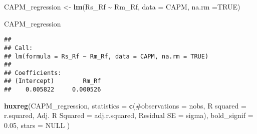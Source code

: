 \documentclass[
]{article}
\newenvironment{Shaded}{\begin{snugshade}}{\end{snugshade}}
\newcommand{\DataTypeTok}[1]{\textcolor[rgb]{0.13,0.29,0.53}{#1}}
\newcommand{\FloatTok}[1]{\textcolor[rgb]{0.00,0.00,0.81}{#1}}
\newcommand{\KeywordTok}[1]{\textcolor[rgb]{0.13,0.29,0.53}{\textbf{#1}}}
\newcommand{\NormalTok}[1]{#1}
\newcommand{\OperatorTok}[1]{\textcolor[rgb]{0.81,0.36,0.00}{\textbf{#1}}}
\newcommand{\OtherTok}[1]{\textcolor[rgb]{0.56,0.35,0.01}{#1}}
\newcommand{\StringTok}[1]{\textcolor[rgb]{0.31,0.60,0.02}{#1}}
\begin{document}
\begin{Shaded}
\begin{Highlighting}[]
\NormalTok{CAPM\_regression \textless{}{-}}\StringTok{ }\KeywordTok{lm}\NormalTok{(Rs\_Rf }\OperatorTok{\textasciitilde{}}\StringTok{ }\NormalTok{Rm\_Rf, }\DataTypeTok{data =}\NormalTok{ CAPM, }\DataTypeTok{na.rm =}\OtherTok{TRUE}\NormalTok{)}

\NormalTok{CAPM\_regression}
\end{Highlighting}
\end{Shaded}

\begin{verbatim}
## 
## Call:
## lm(formula = Rs_Rf ~ Rm_Rf, data = CAPM, na.rm = TRUE)
## 
## Coefficients:
## (Intercept)        Rm_Rf  
##    0.005822     0.000526
\end{verbatim}

\begin{Shaded}
\begin{Highlighting}[]
\KeywordTok{huxreg}\NormalTok{(CAPM\_regression,}
       \DataTypeTok{statistics =} \KeywordTok{c}\NormalTok{(}\StringTok{\textquotesingle{}\#observations\textquotesingle{}}\NormalTok{ =}\StringTok{ \textquotesingle{}nobs\textquotesingle{}}\NormalTok{, }
                      \StringTok{\textquotesingle{}R squared\textquotesingle{}}\NormalTok{ =}\StringTok{ \textquotesingle{}r.squared\textquotesingle{}}\NormalTok{, }
                      \StringTok{\textquotesingle{}Adj. R Squared\textquotesingle{}}\NormalTok{ =}\StringTok{ \textquotesingle{}adj.r.squared\textquotesingle{}}\NormalTok{, }
                      \StringTok{\textquotesingle{}Residual SE\textquotesingle{}}\NormalTok{ =}\StringTok{ \textquotesingle{}sigma\textquotesingle{}}\NormalTok{), }
       \DataTypeTok{bold\_signif =} \FloatTok{0.05}\NormalTok{, }
       \DataTypeTok{stars =} \OtherTok{NULL}
\NormalTok{)}
\end{Highlighting}
\end{Shaded}

 
  \providecommand{\huxb}[2]{\arrayrulecolor[RGB]{#1}\global\arrayrulewidth=#2pt}
  \providecommand{\huxvb}[2]{\color[RGB]{#1}\vrule width #2pt}
  \providecommand{\huxtpad}[1]{\rule{0pt}{#1}}
  \providecommand{\huxbpad}[1]{\rule[-#1]{0pt}{#1}}
\end{document}
